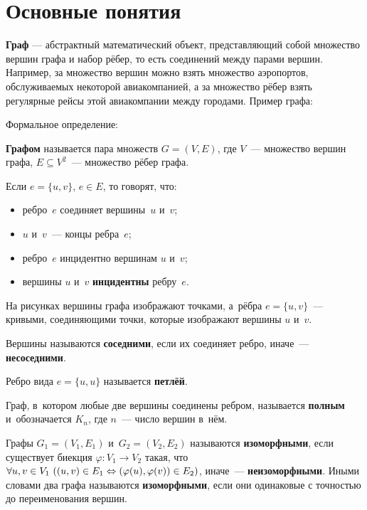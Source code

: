 \section{Основные понятия}
\textbf{Граф} — абстрактный математический объект, представляющий собой множество вершин графа и набор рёбер, то есть соединений между парами вершин. Например, за множество вершин можно взять множество аэропортов, обслуживаемых некоторой авиакомпанией, а за множество рёбер взять регулярные рейсы этой авиакомпании между городами. Пример графа:


Формальное определение:

\textbf{Графом} называется пара множеств $G = (V, E)$, где $V$~--- множество вершин графа, $E \subseteq V^2$~--- множество рёбер графа.

Если $e = \{ u, v \}$, $e \in E$, то говорят, что:
\begin{itemize}
	\item ребро~$e$ соединяет вершины~$u$ и~$v$;
	\item $u$ и~$v$~--- концы ребра~$e$;
	\item ребро~$e$ инцидентно вершинам $u$ и~$v$;
	\item вершины $u$ и~$v$ \textbf{инцидентны} ребру~$e$.
\end{itemize}

На рисунках вершины графа изображают точками, а~рёбра $e = \{ u, v \}$~--- кривыми, соединяющими точки, которые изображают вершины $u$ и~$v$.

Вершины называются \textbf{соседними}, если их соединяет ребро, иначе~--- \textbf{несоседними}.

Ребро вида $e = \{ u, u \}$ называется \textbf{петлёй}.

Граф, в~котором любые две вершины соединены ребром, называется \textbf{полным} и~обозначается $K_n$, где $n$~--- число вершин в~нём.


Графы $G_1 = (V_1, E_1)$ и~$G_2 = (V_2, E_2)$ называются \textbf{изоморфными}, если существует биекция $\varphi \colon V_1 \to V_2$ такая, что
$\forall u, v \in V_1 \ \allowbreak ((u, v) \in E_1 \opbr\Leftrightarrow (\varphi(u), \varphi(v)) \in E_2)$, иначе~--- \textbf{неизоморфными}. Иными словами два графа называются \textbf{изоморфными}, если они одинаковые с точностью до переименования вершин.

